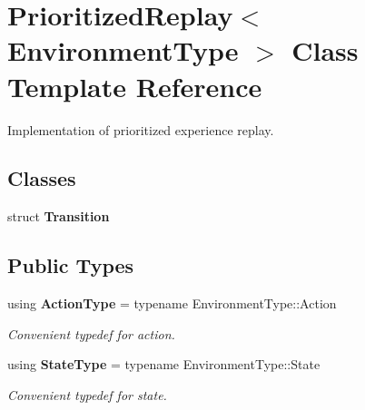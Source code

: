 \section{Prioritized\+Replay$<$ Environment\+Type $>$ Class Template Reference}
\label{classmlpack_1_1rl_1_1PrioritizedReplay}


Implementation of prioritized experience replay.  


\subsection*{Classes}
\begin{DoxyCompactItemize}
\item 
struct \textbf{ Transition}
\end{DoxyCompactItemize}
\subsection*{Public Types}
\begin{DoxyCompactItemize}
\item 
using \textbf{ Action\+Type} = typename Environment\+Type\+::\+Action
\begin{DoxyCompactList}\small\item\em Convenient typedef for action. \end{DoxyCompactList}\item 
using \textbf{ State\+Type} = typename Environment\+Type\+::\+State
\begin{DoxyCompactList}\small\item\em Convenient typedef for state. \end{DoxyCompactList}\end{DoxyCompactItemize}
